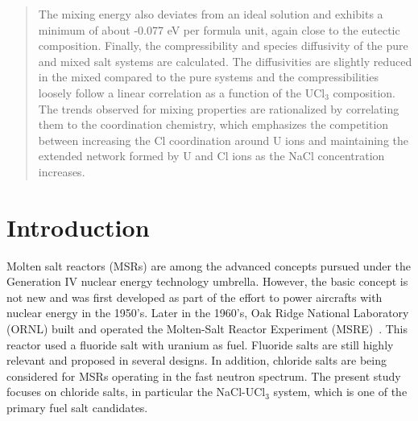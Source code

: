\documentclass[preprint,3p,10pt,onecolumn,number,sort&compress]{elsarticle}
\begin{document}
\begin{frontmatter}
\begin{abstract}
The mixing energy also deviates from an ideal solution and exhibits a minimum of about -0.077 eV per formula unit, again close to the eutectic composition. Finally, the compressibility and species diffusivity of the pure and mixed salt systems are calculated. The diffusivities are slightly reduced in the mixed compared to the pure systems and the compressibilities loosely follow a linear correlation as a function of the UCl$_3$ composition. 
The trends observed for mixing properties are rationalized by correlating them to the coordination chemistry, which emphasizes the competition between increasing the Cl coordination around U ions and maintaining the extended network formed by U and Cl ions as the NaCl concentration increases. %
\end{abstract}




\end{frontmatter}


\section{Introduction}
\label{sec:intro}
Molten salt reactors (MSRs) are among the advanced concepts pursued under the Generation IV nuclear energy technology umbrella. However, the basic concept is not new and was first developed as part of the effort to power aircrafts with nuclear energy in the 1950's. Later in the 1960's, Oak Ridge National Laboratory (ORNL) built and operated the Molten-Salt Reactor Experiment (MSRE)~\cite{MSRE}. This reactor used a fluoride salt with uranium as fuel. Fluoride salts are still highly relevant and proposed in several designs. In addition, chloride salts are being considered for MSRs operating in the fast neutron spectrum. The present study focuses on chloride salts, in particular the NaCl-UCl$_3$ system, which is one of the primary fuel salt candidates.
\end{document}
